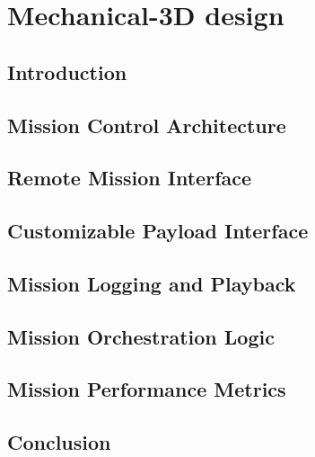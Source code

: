 \chapter{Mechanical-3D design }

\section{Introduction}

\section{Mission Control Architecture}

\section{Remote Mission Interface }

\section{Customizable Payload Interface }

\section{Mission Logging and Playback }

\section{Mission Orchestration Logic}

\section{Mission Performance Metrics}

\section{Conclusion}
